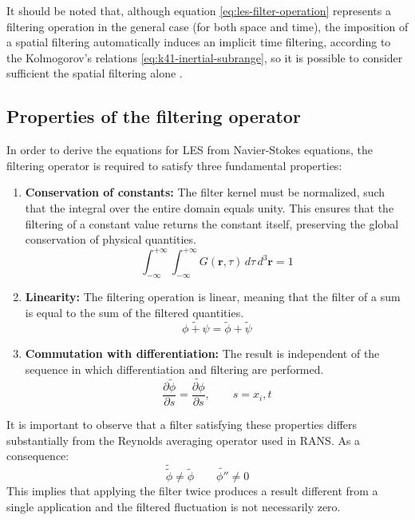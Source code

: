 \documentclass[12pt, a4paper, twoside, openright]{book}
\begin{document}
It should be noted that, although equation \eqref{eq:les-filter-operation} represents a filtering operation in the general case (for both space and time), the imposition of a spatial filtering automatically induces an implicit time filtering, according to the Kolmogorov's relations \eqref{eq:k41-inertial-subrange}, so it is possible to consider sufficient the spatial filtering alone \cite{les-sagaut}.

\subsection{Properties of the filtering operator}

In order to derive the equations for LES from Navier-Stokes equations, the filtering operator is required to satisfy three fundamental properties:

\begin{enumerate}
	\item \textbf{Conservation of constants:} The filter kernel must be normalized, such that the integral over the entire domain equals unity. This ensures that the filtering of a constant value returns the constant itself, preserving the global conservation of physical quantities.
	      \begin{equation}
		      \int_{-\infty}^{+\infty} \! \int_{-\infty}^{+\infty} G(\bm{r}, \tau) \, d\tau \, d^3\bm{r} = 1
	      \end{equation}

	\item \textbf{Linearity:} The filtering operation is linear, meaning that the filter of a sum is equal to the sum of the filtered quantities.
	      \begin{equation}
		      \widetilde{\phi + \psi} = \widetilde{\phi} + \widetilde{\psi}
	      \end{equation}

	\item \textbf{Commutation with differentiation:} The result is independent of the sequence in which differentiation and filtering are performed.
	      \begin{equation}
		      \frac{\partial \widetilde{\phi}}{\partial s} = \widetilde{\frac{\partial \phi}{\partial s}}, \qquad s = x_i, t
	      \end{equation}
\end{enumerate}

It is important to observe that a filter satisfying these properties differs substantially from the Reynolds averaging operator used in RANS. As a consequence:
\begin{equation}
	\widetilde{\widetilde{\phi}} \neq \widetilde{\phi} \qquad \widetilde{\phi''} \neq 0
\end{equation}
This implies that applying the filter twice produces a result different from a single application and the filtered fluctuation is not necessarily zero.
\end{document}
